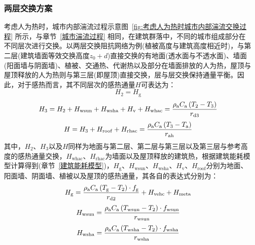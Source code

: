 \subsubsection{两层交换方案}\label{人为热两层方案}
考虑人为热时，城市内部湍流过程示意图~\ref{fig:考虑人为热时城市内部湍流交换过程} 所示，与章节~\ref{城市湍流过程} 相同，在建筑群落中，不同的城市组成部分在不同层次进行交换。以两层交换阻抗网络为例(植被高度与建筑高度相近时)，与第二层(建筑墙面等效交换高度$z_0+d$)直接交换的有地面(透水面与不透水面)、墙面(阳面墙与阴面墙)、植被、交通热、代谢热以及部分在墙面排放的人为热，屋顶与屋顶释放的人为热则与第三层(即屋顶)直接交换，层与层交换保持通量平衡。因此，对于感热而言，其不同层次的感热通量$H$可表达为：
\begin{equation}\label{2lays_H_layer2}
  H_{\mathrm{2}} = H_{\mathrm{g}}
\end{equation}
%
\begin{equation}\label{2lays_H_layer3}
  H_{3} = H_{2} + H_{\mathrm{wsun}} + H_{\mathrm{wsha}} + H_{\mathrm{v}} + H_{\mathrm{whac}} = \frac{\rho _{\rm a} C_{\mathrm a} \left( T_{2} - T_{3} \right)}{r_{\mathrm{d3}}}
\end{equation}
%
\begin{equation}\label{2lays_H}
  H = H_{3} + H_{\mathrm{roof}} + H_{\mathrm{rhac}} = \frac{\rho _{\rm a} C_{\mathrm a} \left( T_{3} - T_{\rm a} \right)}{r_{\mathrm{ah}}}
\end{equation}
其中，$H_2$、$H_3$以及$H$同样为地面与第二层、第二层与第三层以及第三层与参考高度的感热通量交换，$H_{\mathrm{whac}}$、$H_{\mathrm{rhac}}$为墙面以及屋顶释放的建筑热，根据建筑能耗模型计算得到(章节~\ref{建筑能耗模型})，$H_{\mathrm{g}}$、$H_{\mathrm{wsun}}$、$H_{\mathrm{wsha}}$、$H_{\mathrm{v}}$、$H_{\mathrm{roof}}$分别为地面、阳面墙、阴面墙、植被以及屋顶的感热通量，其各自的表达式分别为：
\begin{equation}\label{urban_Hg}
  H_{\mathrm{g}} = \frac{\rho _{\rm a} C_{\mathrm a} \left( T_{\mathrm{g}} - T_{2} \right) \cdot f_{\mathrm{g}}}{r_{\mathrm{d2}}} + H_{\mathrm{vehc}} + H_{\mathrm{meta}}
\end{equation}
%
\begin{equation}
  H_{\mathrm{wsun}} = \frac{\rho  _{\rm a} C_{\mathrm a} \left( T_{\mathrm{wsun}} - T_{\mathrm{2}} \right) \cdot f_{\mathrm{wsun}}}{r_{\mathrm{wsun}}}
\end{equation}
%
\begin{equation}
  H_{\mathrm{wsha}} = \frac{\rho _{\rm a} C_{\mathrm a} \left( T_{\mathrm{wsha}} - T_{\mathrm{2}} \right) \cdot f_{\mathrm{wsha}}}{r_{\mathrm{wsha}}}
\end{equation}
